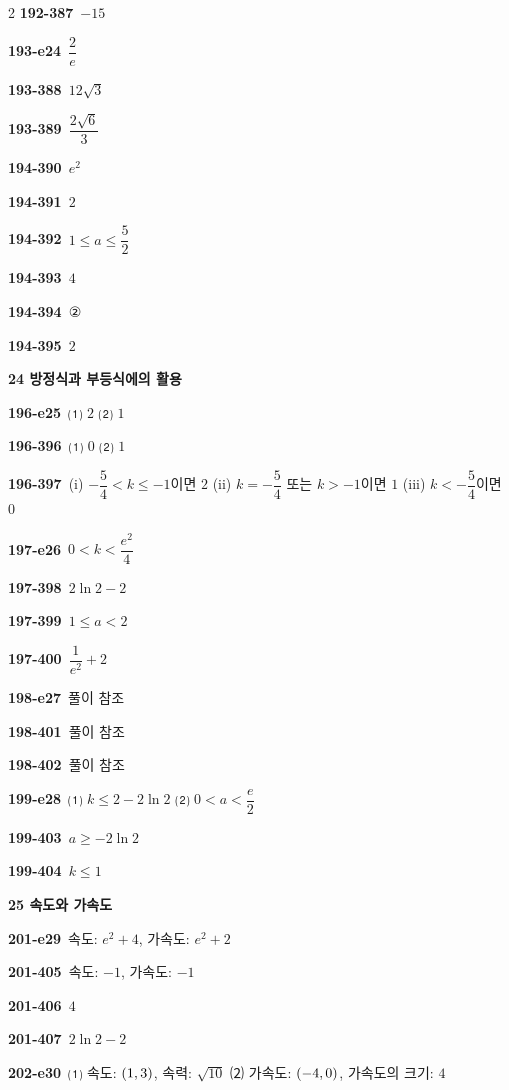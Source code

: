 \documentclass[10pt,a4paper]{article}
\begin{document}
\begin{multicols}{2}
\noindent\textbf{192-387}\ $-15$\par
\noindent\textbf{193-e24}\ $\dfrac{2}{e}$\par
\noindent\textbf{193-388}\ $12\sqrt{3}$\par
\noindent\textbf{193-389}\ $\dfrac{2\sqrt{6}}{3}$\par
\noindent\textbf{194-390}\ $e^2$\par
\noindent\textbf{194-391}\ $2$\par
\noindent\textbf{194-392}\ $1\le a\le\dfrac{5}{2}$\par
\noindent\textbf{194-393}\ $4$\par
\noindent\textbf{194-394}\ ②\par
\noindent\textbf{194-395}\ $2$\par
\noindent\textbf{24 방정식과 부등식에의 활용}\par\smallskip
\noindent\textbf{196-e25}\ ⑴ $2$ ⑵ $1$\par
\noindent\textbf{196-396}\ ⑴ $0$ ⑵ $1$\par
\noindent\textbf{196-397}\ (i) $-\dfrac{5}{4}<k\le -1$이면 $2$ (ii) $k=-\dfrac{5}{4}$ 또는 $k>-1$이면 $1$ (iii) $k<-\dfrac{5}{4}$이면 $0$\par
\noindent\textbf{197-e26}\ $0<k<\dfrac{e^2}{4}$\par
\noindent\textbf{197-398}\ $2\ln 2-2$\par
\noindent\textbf{197-399}\ $1\le a<2$\par
\noindent\textbf{197-400}\ $\dfrac{1}{e^2}+2$\par
\noindent\textbf{198-e27}\ 풀이 참조\par
\noindent\textbf{198-401}\ 풀이 참조\par
\noindent\textbf{198-402}\ 풀이 참조\par
\noindent\textbf{199-e28}\ ⑴ $k\le 2-2\ln 2$ ⑵ $0<a<\dfrac{e}{2}$\par
\noindent\textbf{199-403}\ $a\ge -2\ln 2$\par
\noindent\textbf{199-404}\ $k\le 1$\par
\noindent\textbf{25 속도와 가속도}\par\smallskip
\noindent\textbf{201-e29}\ 속도: $e^2+4$, 가속도: $e^2+2$\par
\noindent\textbf{201-405}\ 속도: $-1$, 가속도: $-1$\par
\noindent\textbf{201-406}\ $4$\par
\noindent\textbf{201-407}\ $2\ln 2-2$\par
\noindent\textbf{202-e30}\ ⑴ 속도: $(1{,}\mkern3mu\mathopen{}3)$, 속력: $\sqrt{10}$ ⑵ 가속도: $(-4{,}\mkern3mu\mathopen{}0)$, 가속도의 크기: $4$\par

\end{multicols}
\end{document}
